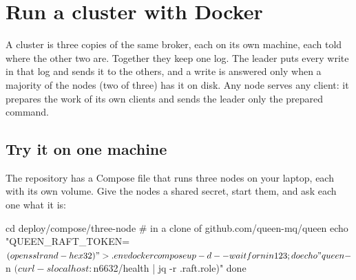 %

\section{Run a cluster with Docker}

A cluster is three copies of the same broker, each on its own machine, each told where the other
two are. Together they keep one log. The leader puts every write in that log and sends it to the
others, and a write is answered only when a majority of the nodes (two of three) has it on disk.
Any node serves any client: it prepares the work of its own clients and sends the leader only the
prepared command.



\subsection{Try it on one machine}

The repository has a Compose file that runs three nodes on your laptop, each with its own volume.
Give the nodes a shared secret, start them, and ask each one what it is:

\begin{shell}
cd deploy/compose/three-node        # in a clone of github.com/queen-mq/queen
echo "QUEEN_RAFT_TOKEN=$(openssl rand -hex 32)" > .env
docker compose up -d --wait
for n in 1 2 3; do
  echo "queen-$n $(curl -s localhost:${n}6632/health | jq -r .raft.role)"
done
\end{shell}

